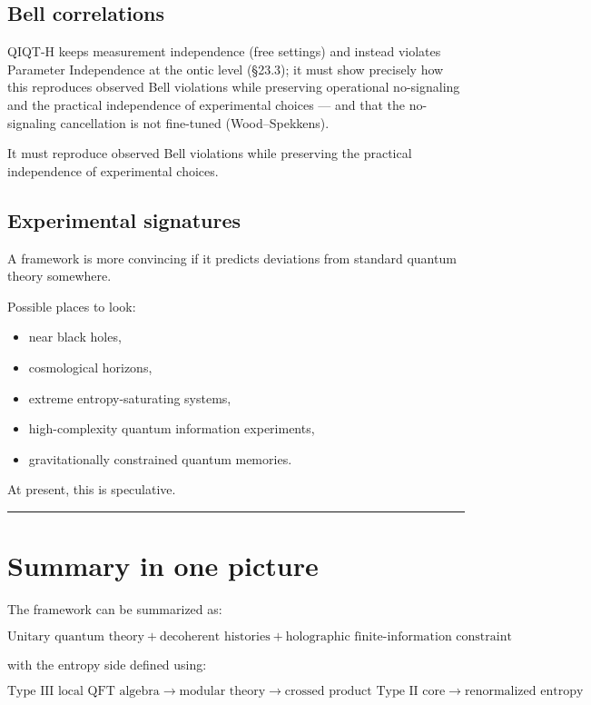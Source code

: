 \documentclass[11pt,a4paper]{article}
\begin{document}
\subsection{Bell correlations}

QIQT-H keeps measurement independence (free settings) and instead violates Parameter Independence at the ontic level (§23.3); it must show precisely how this reproduces observed Bell violations while preserving operational no-signaling and the practical independence of experimental choices — and that the no-signaling cancellation is not fine-tuned (Wood–Spekkens).

It must reproduce observed Bell violations while preserving the practical independence of experimental choices.

\subsection{Experimental signatures}

A framework is more convincing if it predicts deviations from standard quantum theory somewhere.

Possible places to look:

\begin{itemize}
  \item near black holes,
  \item cosmological horizons,
  \item extreme entropy-saturating systems,
  \item high-complexity quantum information experiments,
  \item gravitationally constrained quantum memories.
\end{itemize}

At present, this is speculative.

\medskip\hrule\medskip

\section{Summary in one picture}

The framework can be summarized as:

\[
\boxed{
\text{Unitary quantum theory}
+
\text{decoherent histories}
+
\text{holographic finite-information constraint}
}
\]

with the entropy side defined using:

\[
\boxed{
\text{Type III local QFT algebra}
\rightarrow
\text{modular theory}
\rightarrow
\text{crossed product Type II core}
\rightarrow
\text{renormalized entropy}
}
\]
\end{document}
